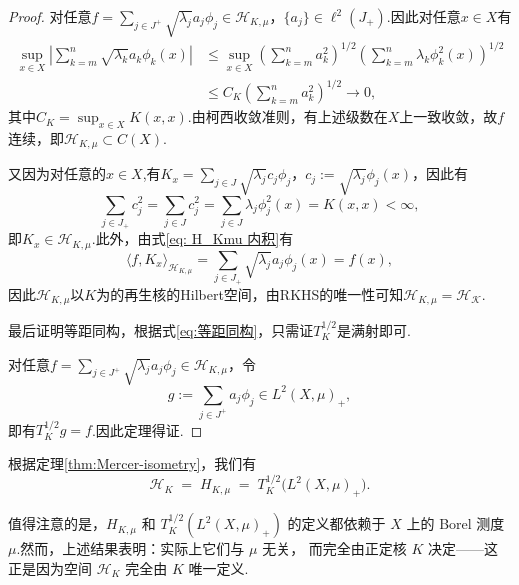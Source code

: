 \documentclass[12pt, a4paper, oneside]{ctexbook}
\begin{document}
\begin{proof}
    对任意$f = \sum_{j\in J^+}\sqrt{\lambda_j}a_j\phi_j\in \mathcal{H}_{K,\mu}$，$\{a_j\}\in \ell^2(J_+)$.因此对任意$x\in X$有
    \begin{align*}
        \sup_{x\in X} \left|\sum_{k=m}^n \sqrt{\lambda_k}a_k\phi_k(x)\right|&\leq \sup_{x\in X}\left(\sum_{k=m}^na_k^2\right)^{1/2}\left(\sum_{k=m}^n\lambda_k\phi^2_k(x)\right)^{1/2}\\
        &\leq C_K\left(\sum_{k=m}^na_k^2\right)^{1/2}\to 0,
    \end{align*}
其中$C_K = \sup_{x\in X}K(x,x)$.由柯西收敛准则，有上述级数在$X$上一致收敛，故$f$连续，即$\mathcal{H}_{K,\mu}\subset C(X).$

又因为对任意的$x\in X$,有$K_x = \sum_{j\in J}\sqrt{\lambda_j}c_j\phi_j$，$c_j:=\sqrt{\lambda_j}\phi_j(x)$，因此有
\begin{equation*}
    \sum_{j\in J_+}c_j^2 = \sum_{j\in J}c_j^2 = \sum_{j\in J}\lambda_j\phi_j^2(x) = K(x,x)<\infty,
\end{equation*}
即$K_x\in \mathcal{H}_{K,\mu}.$此外，由式\eqref{eq: H_Kmu 内积}有
\begin{equation*}
    \langle f,K_x\rangle_{\mathcal{H}_{K,\mu}}=\sum_{j\in J_+}\sqrt{\lambda_j}a_j\phi_j(x) = f(x),
\end{equation*}
因此$\mathcal{H}_{K,\mu}$以$K$为的再生核的Hilbert空间，由RKHS的唯一性可知$\mathcal{H}_{K,\mu}=\mathcal{H_K}.$

最后证明等距同构，根据式\eqref{eq:等距同构}，只需证$T_K^{1/2}$是满射即可.

对任意$f = \sum_{j\in J^+}\sqrt{\lambda_j}a_j\phi_j\in \mathcal{H}_{K,\mu}$，令$$g:=\sum_{j\in J^+}a_j\phi_j\in L^2(X,\mu)_+,$$即有$T_K^{1/2}g = f$.因此定理得证.
\end{proof}
根据定理\ref{thm:Mercer-isometry}，我们有
\[
\mathcal{H}_K \;=\; H_{K,\mu} \;=\; T_K^{1/2}\big(L^{2}(X,\mu)_{+}\big).
\]

值得注意的是，$H_{K,\mu}$ 和 $T_K^{1/2}\!\left(L^{2}(X,\mu)_{+}\right)$ 的定义都依赖于
$X$ 上的 Borel 测度 $\mu$.然而，上述结果表明：实际上它们与 $\mu$ 无关，
而完全由正定核 $K$ 决定——这正是因为空间 $\mathcal{H}_K$ 完全由 $K$ 唯一定义.
\end{document}
